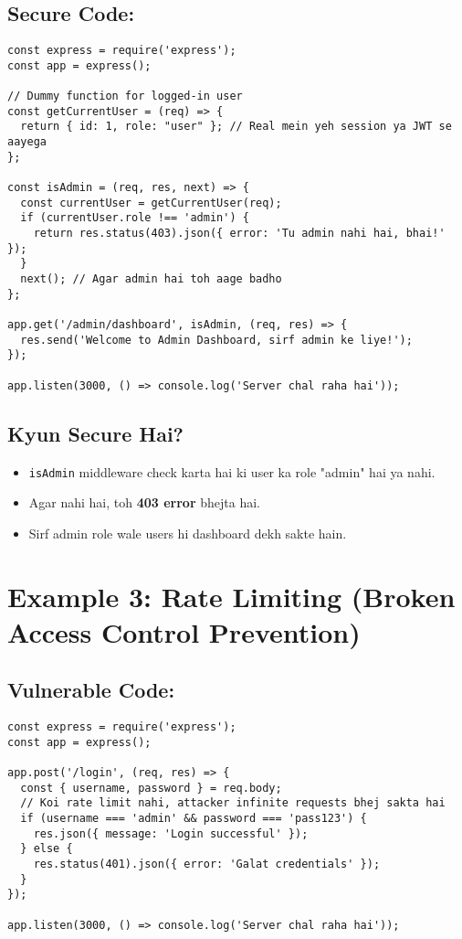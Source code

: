 \documentclass[a4paper, 12pt]{article}
\begin{document}
\subsection{Secure Code:}
\begin{lstlisting}[caption={Secure Admin Dashboard with Middleware}]
const express = require('express');
const app = express();

// Dummy function for logged-in user
const getCurrentUser = (req) => {
  return { id: 1, role: "user" }; // Real mein yeh session ya JWT se aayega
};

const isAdmin = (req, res, next) => {
  const currentUser = getCurrentUser(req);
  if (currentUser.role !== 'admin') {
    return res.status(403).json({ error: 'Tu admin nahi hai, bhai!' });
  }
  next(); // Agar admin hai toh aage badho
};

app.get('/admin/dashboard', isAdmin, (req, res) => {
  res.send('Welcome to Admin Dashboard, sirf admin ke liye!');
});

app.listen(3000, () => console.log('Server chal raha hai'));
\end{lstlisting}

\subsection{Kyun Secure Hai?}
\begin{itemize}
    \item \texttt{isAdmin} middleware check karta hai ki user ka role "admin" hai ya nahi.
    \item Agar nahi hai, toh \textbf{\color{importantred}403 error} bhejta hai.
    \item Sirf admin role wale users hi dashboard dekh sakte hain.
\end{itemize}

\section{Example 3: Rate Limiting (Broken Access Control Prevention)}
\subsection{Vulnerable Code:}
\begin{lstlisting}[caption={Vulnerable Login Endpoint}]
const express = require('express');
const app = express();

app.post('/login', (req, res) => {
  const { username, password } = req.body;
  // Koi rate limit nahi, attacker infinite requests bhej sakta hai
  if (username === 'admin' && password === 'pass123') {
    res.json({ message: 'Login successful' });
  } else {
    res.status(401).json({ error: 'Galat credentials' });
  }
});

app.listen(3000, () => console.log('Server chal raha hai'));
\end{lstlisting}
\end{document}
